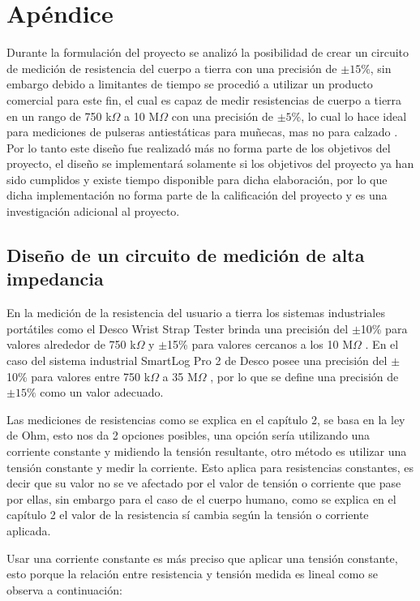 \chapter{Apéndice}
\label{ap:medicion_alta_impedancia}

Durante la formulación del proyecto se analizó la posibilidad de crear un circuito de medición de resistencia del cuerpo a tierra con una 
precisión de $\pm15$\%, sin embargo debido a limitantes de tiempo se procedió a utilizar un producto comercial para este fin, el cual es capaz 
de medir resistencias de cuerpo a tierra en un rango de 750 k$\Omega$ a 10 M$\Omega$ con una precisión de $\pm5$\%, lo cual lo hace ideal para 
mediciones de pulseras antiestáticas para muñecas, mas no para calzado \cite{HZR171}. Por lo tanto este diseño fue realizadó más no forma parte de los objetivos 
del proyecto, el diseño se implementará solamente si los objetivos del proyecto ya han sido cumplidos y existe tiempo disponible para dicha elaboración, 
por lo que dicha implementación no forma parte de la calificación del proyecto y es una investigación adicional al proyecto.

\section{Diseño de un circuito de medición de alta impedancia}

En la medición de la resistencia del usuario a tierra los 
sistemas industriales portátiles como el Desco Wrist Strap Tester brinda una precisión del $\pm$10\% para valores alrededor de 
750 k$\Omega$ y $\pm$15\% para valores cercanos a los 10 M$\Omega$ \cite{Desco_19240}. En el caso del sistema industrial SmartLog Pro 2 de Desco posee 
una precisión del $\pm$10\% para valores entre 750 k$\Omega$ a 35 M$\Omega$ \cite{Desco_SmartLog}, por lo que se define una precisión de $\pm15\%$ 
como un valor adecuado.

Las mediciones de resistencias como se explica en el capítulo 2, se basa en la ley de Ohm, esto nos da 2 opciones posibles, una opción sería
utilizando una corriente constante y midiendo la tensión resultante, otro método es utilizar una tensión constante y medir la corriente. Esto 
aplica para resistencias constantes, es decir que su valor no se ve afectado por el valor de tensión o corriente que pase por ellas, sin embargo
para el caso de el cuerpo humano, como se explica en el capítulo 2 el valor de la resistencia sí cambia según la tensión o corriente aplicada.

Usar una corriente constante es más preciso que aplicar una tensión constante, esto porque la relación entre resistencia y tensión medida es lineal como 
se observa a continuación:

